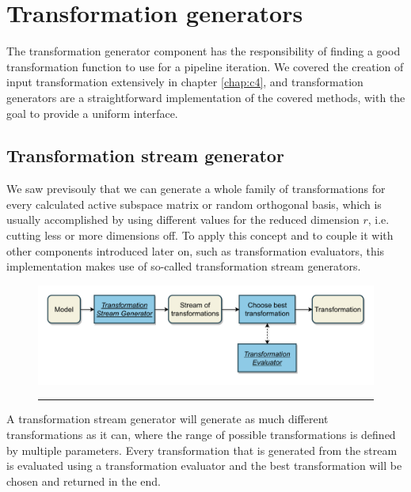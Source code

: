 \documentclass[
  a4paper,  %
  twoside,  %
  bibliography=totoc,
  headsepline,
  cleardoublepage=empty,
  parskip=half,
  draft=false
]{scrbook}
\newcommand{\delimit}{{\color{charcoal}\noindent\rule{\textwidth}{1pt}}}
\begin{document}
\newpage
\section {Transformation generators}
\label{sec:tg}

The transformation generator component has the responsibility of finding a good transformation function to use for a pipeline iteration.
We covered the creation of input transformation extensively in chapter \cref{chap:c4}, and transformation generators are a straightforward implementation of the covered methods, with the goal to provide a uniform interface.

\subsection {Transformation stream generator}

We saw previsouly that we can generate a whole family of transformations for every calculated active subspace matrix or random orthogonal basis, which is usually accomplished by using different values for the reduced dimension $r$, i.e. cutting less or more dimensions off.
To apply this concept and to couple it with other components introduced later on, such as transformation evaluators, this implementation makes use of so-called transformation stream generators.

\begin{mdframed}[style=style,frametitle={Transformation generator (stream-based)}]
\begin{figure}[H]
\includegraphics[width=\textwidth]{graphics/TransformationGen_Stream.pdf}
\delimit

\end{figure}
\end{mdframed}

A transformation stream generator will generate as much different transformations as it can, where the range of possible transformations is defined by multiple parameters.
Every transformation that is generated from the stream is evaluated using a transformation evaluator and the best transformation will be chosen and returned in the end.
\end{document}
